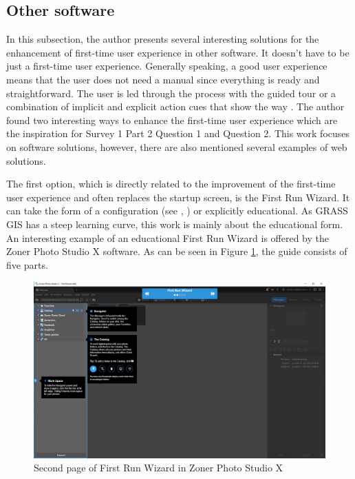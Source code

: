 \documentclass[a4paper,10pt,twoside]{article}
\begin{document}
\newpage
\vspace*{-1cm}
\subsection{Other software}
\label{sec:other_software}

In this subsection, the author presents several interesting solutions
for the enhancement of first-time user experience in other
software. It doesn't have to be just a first-time user
experience. Generally speaking, a good user experience means that the
user does not need a manual since everything is ready and
straightforward. The user is led through the process with the guided
tour or a combination of implicit and explicit action cues that show
the way \cite{ftue2}. The author found two interesting ways to enhance
the first-time user experience which are the inspiration for Survey 1
Part 2 Question 1 and Question 2. This work focuses on software
solutions, however, there are also mentioned several examples of web
solutions.

The first option, which is directly related to the improvement of the
first-time user experience and often replaces the startup screen, is
the First Run Wizard. It can take the form of a configuration (see
\cite{lansweeper}, \cite{jetbrains}) or explicitly educational. As
GRASS GIS has a steep learning curve, this work is mainly about the
educational form. An interesting example of an educational First Run
Wizard is offered by the Zoner Photo Studio X software. As can be seen
in Figure \ref{fig:zoner}, the guide consists of five parts.

\vspace{0.3cm}
\begin{figure}[hbt!] 
\begin{center}
\includegraphics[width=17cm]{../pictures/zoner_first_run_2.png} 
\caption[Second page of First Run Wizard in Zoner Photo Studio X]{Second page of First Run Wizard in Zoner Photo Studio X}
\label{fig:zoner}
\end{center}
\end{figure}
\end{document}
